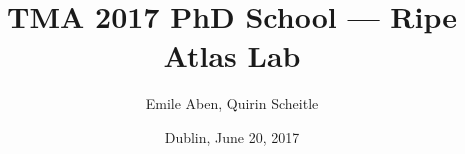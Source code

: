 %
% 
% 
%

\usepackage{soul}
\renewcommand{\PersonTitel}{}
\newcommand{\Datum}{\today}

\renewcommand{\PraesentationFusszeileZusatz}{TMA'17 Ripe Atlas Lab}

\title{TMA 2017 PhD School --- Ripe Atlas Lab}
\author{Emile Aben, Quirin Scheitle}
\institute[]{\UniversitaetName \\ \FakultaetName}
\date[\Datum]{Dublin, June 20, 2017}
\subject{}
\usepackage{tikz}


\usepackage{xspace}
\usepackage{todonotes}
\usepackage{tikz}
\usepackage{booktabs}


\usepackage{hyperref,xcolor,color,colortbl,graphicx,tabularx}
\usepackage{pgfplots}
\usepackage{multirow}
\usepackage{xspace}
\usepackage{environ}
\usepackage{comment}
\usepackage{subcaption}
\usepackage{subfloat}
\usepackage{textgreek}  %
\usepackage{soul} %




\newcommand{\packet}[3]{
	\draw[-latex,line width=0.7pt] (#1) to node[above,sloped]{\scriptsize{{#3}}} (#2);}

\newcommand{\dpacket}[3]{
	\draw[latex-latex,line width=0.7pt] (#1) to node[above,sloped]{\scriptsize{{#3}}} (#2);}

\usepackage{tumcolor}





